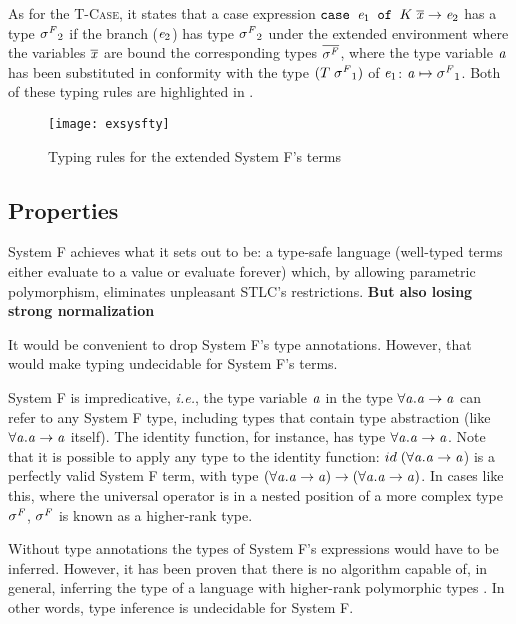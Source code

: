 As for the \textsc{T-Case}, it states that a case expression $\mathit{\texttt{case }} \mathit{e}_1 \mathit{\texttt{ of }} K \; \overline{\mathit{x}} \rightarrow \mathit{e}_2$ has a type $\mathit{\sigma^F}_2$ if the branch ($\mathit{e}_2$) has type $\mathit{\sigma^F}_2$ under the extended environment where the variables $\overline{\mathit{x}}$ are bound the corresponding types $\overline{\mathit{\sigma^F}}$, where the type variable $\mathit{a}$ has been substituted in conformity with the type $(T\;\mathit{\sigma^F}_1)$ of $\mathit{e}_1$: $\mathit{a} \mapsto \mathit{\sigma^F}_1$. Both of these typing rules are highlighted in .

\begin{figure}
  \texttt{[image: exsysfty]}
    \caption{Typing rules for the extended System F's terms}
  \label{exsysftytm}
\end{figure}

\subsection{Properties}
System F achieves what it sets out to be: a type-safe language (well-typed terms either evaluate to a value or evaluate forever) which, by allowing parametric polymorphism, eliminates unpleasant STLC's restrictions. \textbf{But also losing strong normalization}

It would be convenient to drop System F's type annotations. However, that would make typing undecidable for System F's terms.

System F is impredicative, \textit{i.e.}, the type variable $\mathit{a}$ in the type $\forall {\mathit{a}} . {\mathit{a} \rightarrow \mathit{a}}$ can refer to any System F type, including types that contain type abstraction (like $\forall {\mathit{a}} . {\mathit{a} \rightarrow \mathit{a}}$ itself). The identity function, for instance, has type $\forall {\mathit{a}} . {\mathit{a} \rightarrow \mathit{a}}$. Note that it is possible to apply any type to the identity function: $id\;(\forall {\mathit{a}} . {\mathit{a} \rightarrow \mathit{a}}$) is a perfectly valid System F term, with type $(\forall {\mathit{a}} . {\mathit{a} \rightarrow \mathit{a}}) \rightarrow (\forall {\mathit{a}} . {\mathit{a} \rightarrow \mathit{a}})$. In cases like this, where the universal operator is in a nested position of a more complex type $\mathit{\sigma^F}$, $\mathit{\sigma^F}$ is known as a higher-rank type.

Without type annotations the types of System F's expressions would have to be inferred. However, it has been proven that there is no algorithm capable of, in general, inferring the type of a language with higher-rank polymorphic types \cite{jones}. In other words, type inference is undecidable for System F.

